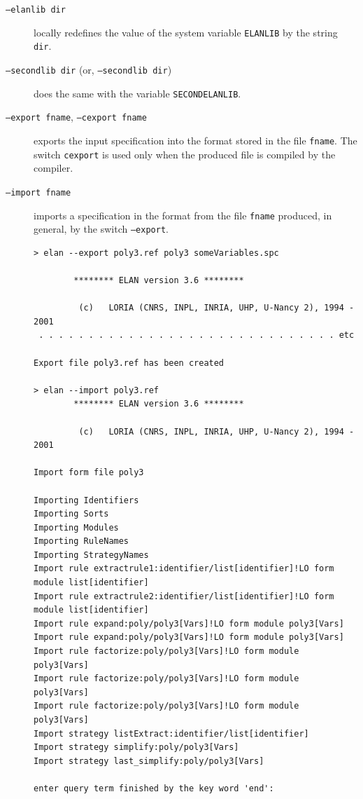 \begin{description}
 \item[{\tt --elanlib dir}]
   locally redefines the value
   of the system variable {\tt ELANLIB} by the string \verb|dir|.

 \item[{\tt --secondlib dir} (or, {\tt --secondlib dir})]
   does the same with
   the variable {\tt SECONDELANLIB}.

 \item[{\tt --export fname}, {\tt --cexport fname}]
  exports the input specification into the \REF{} format stored in the file {\tt fname}.
  The switch {\tt cexport} is used only when the produced \REF{} file is compiled by the
        \elan{} compiler.

 \item[{\tt --import fname}] 
  imports a specification in the \REF{} format from the \REF{} file {\tt fname}
  produced, in general, by the switch {\tt --export}.
{\footnotesize\begin{verbatim}
> elan --export poly3.ref poly3 someVariables.spc

        ******** ELAN version 3.6 ********

         (c)   LORIA (CNRS, INPL, INRIA, UHP, U-Nancy 2), 1994 - 2001
 . . . . . . . . . . . . . . . . . . . . . . . . . . . . . . etc

Export file poly3.ref has been created

> elan --import poly3.ref
        ******** ELAN version 3.6 ********

         (c)   LORIA (CNRS, INPL, INRIA, UHP, U-Nancy 2), 1994 - 2001

Import form file poly3

Importing Identifiers
Importing Sorts
Importing Modules
Importing RuleNames
Importing StrategyNames
Import rule extractrule1:identifier/list[identifier]!LO form module list[identifier]
Import rule extractrule2:identifier/list[identifier]!LO form module list[identifier]
Import rule expand:poly/poly3[Vars]!LO form module poly3[Vars]
Import rule expand:poly/poly3[Vars]!LO form module poly3[Vars]
Import rule factorize:poly/poly3[Vars]!LO form module poly3[Vars]
Import rule factorize:poly/poly3[Vars]!LO form module poly3[Vars]
Import rule factorize:poly/poly3[Vars]!LO form module poly3[Vars]
Import strategy listExtract:identifier/list[identifier]
Import strategy simplify:poly/poly3[Vars]
Import strategy last_simplify:poly/poly3[Vars]

enter query term finished by the key word 'end':
\end{verbatim} }


\end{description}
